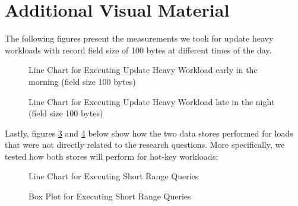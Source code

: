 \documentclass[letterpaper, 10 pt, conference]{ieeeconf}  %
\begin{document}
\addtolength{\textheight}{-12cm}   %

 
 

\printbibliography

\section{Additional Visual Material}
The following figures present the measurements we took for update heavy workloads with record field size of 100 bytes at different times of the day.
\begin{figure}[h]
\centering
{}
\caption{Line Chart for Executing Update Heavy Workload early in the morning (field size 100 bytes)}
\label{fig:workloadA_morning}
\end{figure}  

\begin{figure}[h]
\centering
{}
\caption{Line Chart for Executing Update Heavy Workload late in the night (field size 100 bytes)}
\label{fig:workloadA_night}
\end{figure}  

Lastly, figures \ref{fig:workloadEChart} and \ref{fig:workloadEBox} below show how the two data stores performed for loads that were not directly related to the research questions. More specifically, we tested how both stores will perform for hot-key workloads:
\begin{figure}[h]
\centering
{}
\caption{Line Chart for Executing Short Range Queries}
\label{fig:workloadEChart}
\end{figure}  

\begin{figure}[h]
\centering
{}
\caption{Box Plot for Executing Short Range Queries}
\label{fig:workloadEBox}
\end{figure}  
\end{document}
